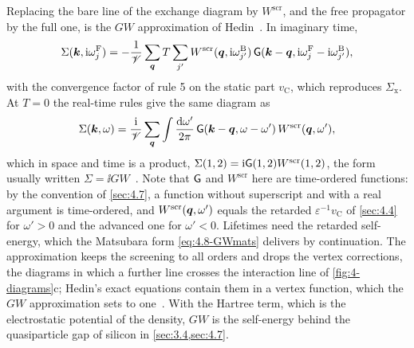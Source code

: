 Replacing the bare line of the exchange diagram by $W^{\mathrm{scr}}$, and the free propagator by the full one, is the $GW$ approximation of Hedin~\cite{hedin1965new}. In imaginary time,
\begin{equation}
  \Sigma(\bm{k},\mathrm{i}\omega^{\mathrm{F}}_j) = -\frac1{\mathscr{V}}\sum_{\bm{q}}T\sum_{j'}W^{\mathrm{scr}}(\bm{q},\mathrm{i}\omega^{\mathrm{B}}_{j'})\,\mathsf{G}(\bm{k} - \bm{q},\mathrm{i}\omega^{\mathrm{F}}_j - \mathrm{i}\omega^{\mathrm{B}}_{j'}) ,
  \label{eq:4.8-GWmats}
\end{equation}
with the convergence factor of rule 5 on the static part $v_{\mathrm{C}}$, which reproduces $\Sigma_{\mathrm{x}}$. At $T = 0$ the real-time rules give the same diagram as
\begin{equation}
  \Sigma(\bm{k},\omega) = \frac{\mathrm{i}}{\mathscr{V}}\sum_{\bm{q}}\int\frac{\mathrm{d}\omega'}{2\pi}\,\mathsf{G}(\bm{k} - \bm{q},\omega - \omega')\,W^{\mathrm{scr}}(\bm{q},\omega') ,
  \label{eq:4.8-GW}
\end{equation}
which in space and time is a product, $\Sigma(1,2) = \mathrm{i}\mathsf{G}(1,2)W^{\mathrm{scr}}(1,2)$, the form usually written $\Sigma = \ii GW$~\cite[Eqs.~(60) and (61)]{aryasetiawan1998gw}. Note that $\mathsf{G}$ and $W^{\mathrm{scr}}$ here are time-ordered functions: by the convention of \cref{sec:4.7}, a function without superscript and with a real argument is time-ordered, and $W^{\mathrm{scr}}(\bm{q},\omega')$ equals the retarded $\varepsilon^{-1}v_{\mathrm{C}}$ of \cref{sec:4.4} for $\omega' > 0$ and the advanced one for $\omega' < 0$. Lifetimes need the retarded self-energy, which the Matsubara form \cref{eq:4.8-GWmats} delivers by continuation. The approximation keeps the screening to all orders and drops the vertex corrections, the diagrams in which a further line crosses the interaction line of \cref{fig:4-diagrams}c; Hedin's exact equations contain them in a vertex function, which the $GW$ approximation sets to one~\cite[Eqs.~(43)--(46)]{aryasetiawan1998gw}. With the Hartree term, which is the electrostatic potential of the density, $GW$ is the self-energy behind the quasiparticle gap of silicon in \cref{sec:3.4,sec:4.7}.

